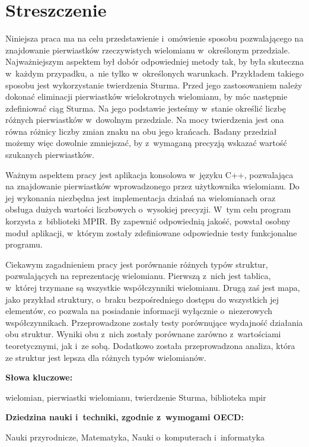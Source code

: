 \chapter*{Streszczenie}
\indent
Niniejsza praca ma na celu przedstawienie i~omówienie sposobu pozwalającego na znajdowanie pierwiastków rzeczywistych wielomianu w~określonym przedziale. Najważniejszym aspektem był dobór odpowiedniej metody tak, by była skuteczna w~każdym przypadku, a~nie tylko w~określonych warunkach. Przykładem takiego sposobu jest wykorzystanie twierdzenia Sturma. Przed jego zastosowaniem należy dokonać eliminacji pierwiastków wielokrotnych wielomianu, by móc następnie zdefiniować ciąg Sturma. Na jego podstawie jesteśmy w~stanie określić liczbę różnych pierwiastków w~dowolnym przedziale.  Na mocy twierdzenia jest ona równa różnicy liczby zmian znaku na obu jego krańcach. Badany przedział możemy więc dowolnie zmniejszać, by z~wymaganą precyzją wskazać wartość szukanych pierwiastków.

Ważnym aspektem pracy jest aplikacja konsolowa w~języku C++, pozwalająca na znajdowanie pierwiastków wprowadzonego przez użytkownika wielomianu. Do jej wykonania niezbędna jest implementacja działań na wielomianach oraz obsługa dużych wartości liczbowych o~wysokiej precyzji. W~tym celu program korzysta z~biblioteki MPIR. By zapewnić odpowiednią jakość, powstał osobny moduł aplikacji, w~którym zostały zdefiniowane odpowiednie testy funkcjonalne programu.

Ciekawym zagadnieniem pracy jest porównanie różnych typów struktur, pozwalających na reprezentację wielomianu. Pierwszą z~nich jest tablica, w~której trzymane są wszystkie współczynniki wielomianu. Drugą zaś jest mapa, jako przykład struktury, o~braku bezpośredniego dostępu do wszystkich jej elementów, co pozwala na posiadanie informacji wyłącznie o~niezerowych współczynnikach. Przeprowadzone zostały testy porównujące wydajność działania obu struktur. Wyniki obu z~nich zostały porównane zarówno z~wartościami teoretycznymi, jak i~ze sobą. Dodatkowo została przeprowadzona analiza, która ze struktur jest lepsza dla różnych typów wielomianów.

\vspace{12pt}
\noindent\textbf{Słowa kluczowe:}

wielomian, pierwiastki wielomianu, twierdzenie Sturma, biblioteka mpir

\vspace{12pt}
\noindent\textbf{Dziedzina nauki i~techniki, zgodnie z~wymogami OECD:}

Nauki przyrodnicze, Matematyka, Nauki o~komputerach i~informatyka
